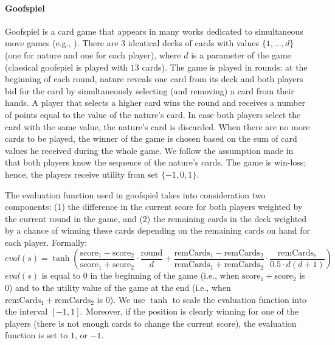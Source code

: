 \paragraph{\textbf{Goofspiel}}
Goofspiel is a card game that appears in many works dedicated to simultaneous move games (e.g., \cite{Saffidine12SMAB,Rhoads12Computer,Lanctot13Goofspiel}). 
There are $3$ identical decks of cards with values $\{1,\dots, d\}$ (one for nature and one for each player), where $d$ is a parameter of the game (classical goofspiel is played with $13$ cards). 
The game is played in rounds: at the beginning of each round, nature reveals one card from its deck and both players bid for the card by simultaneously selecting (and removing) a card from their hands. 
A player that selects a higher card wins the round and receives a number of points equal to the value of the nature's card. In case both players select the card with the same value, the nature's card is discarded. 
When there are no more cards to be played, the winner of the game is chosen based on the sum of card values he received during the whole game. 
We follow the assumption made in \cite{Saffidine12SMAB} that both players know the sequence of the nature's cards. 
The game is win-loss; hence, the players receive utility from set $\lbrace -1, 0, 1 \rbrace$.

The evaluation function used in goofspiel takes into consideration two components: (1) the difference in the current score for both players weighted by the current round in the game, and (2) the remaining cards in the deck weighted by a chance of winning these cards depending on the remaining cards on hand for each player. Formally:
$$
eval(s) = \tanh\left(\frac{\textrm{score}_1 - \textrm{score}_2}{\textrm{score}_1 + \textrm{score}_2}\cdot\frac{\textrm{round}}{d} + \frac{\textrm{remCards}_1 - \textrm{remCards}_2}{\textrm{remCards}_1 + \textrm{remCards}_2}\cdot\frac{\textrm{remCards}_c}{0.5\cdot d(d+1)}\right)
$$
$eval(s)$ is equal to $0$ in the beginning of the game (i.e., when $\textrm{score}_1 + \textrm{score}_2$ is $0$) and to the utility value of the game at the end (i.e., when $\textrm{remCards}_1 + \textrm{remCards}_2$ is $0$). We use $\tanh$ to scale the evaluation function into the interval $[-1,1]$.
Moreover, if the position is clearly winning for one of the players (there is not enough cards to change the current score), the evaluation function is set to $1$, or $-1$.
